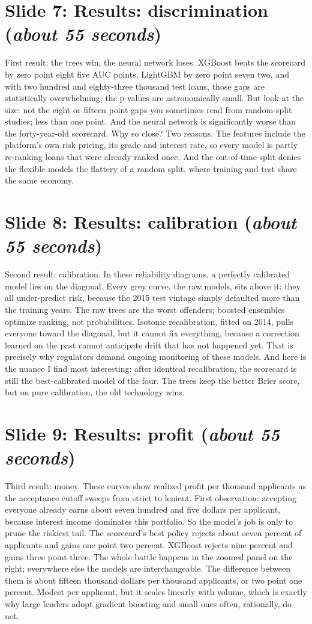 \documentclass[a4paper,11pt]{article}
\newcommand{\slideblock}[3]{%
  \section*{Slide #1: #2 \hfill \normalfont\small(\textit{#3})}}
\begin{document}
\slideblock{7}{Results: discrimination}{about 55 seconds}
First result: the trees win, the neural network loses. XGBoost beats the scorecard by zero point eight five AUC points, LightGBM by zero point seven two, and with two hundred and eighty-three thousand test loans, those gaps are statistically overwhelming; the p-values are astronomically small. But look at the size: not the eight or fifteen point gaps you sometimes read from random-split studies; less than one point. And the neural network is significantly worse than the forty-year-old scorecard. Why so close? Two reasons. The features include the platform's own risk pricing, its grade and interest rate, so every model is partly re-ranking loans that were already ranked once. And the out-of-time split denies the flexible models the flattery of a random split, where training and test share the same economy.

\slideblock{8}{Results: calibration}{about 55 seconds}
Second result: calibration. In these reliability diagrams, a perfectly calibrated model lies on the diagonal. Every grey curve, the raw models, sits above it: they all under-predict risk, because the 2015 test vintage simply defaulted more than the training years. The raw trees are the worst offenders; boosted ensembles optimize ranking, not probabilities. Isotonic recalibration, fitted on 2014, pulls everyone toward the diagonal, but it cannot fix everything, because a correction learned on the past cannot anticipate drift that has not happened yet. That is precisely why regulators demand ongoing monitoring of these models. And here is the nuance I find most interesting: after identical recalibration, the scorecard is still the best-calibrated model of the four. The trees keep the better Brier score, but on pure calibration, the old technology wins.

\slideblock{9}{Results: profit}{about 55 seconds}
Third result: money. These curves show realized profit per thousand applicants as the acceptance cutoff sweeps from strict to lenient. First observation: accepting everyone already earns about seven hundred and five dollars per applicant, because interest income dominates this portfolio. So the model's job is only to prune the riskiest tail. The scorecard's best policy rejects about seven percent of applicants and gains one point two percent. XGBoost rejects nine percent and gains three point three. The whole battle happens in the zoomed panel on the right; everywhere else the models are interchangeable. The difference between them is about fifteen thousand dollars per thousand applicants, or two point one percent. Modest per applicant, but it scales linearly with volume, which is exactly why large lenders adopt gradient boosting and small ones often, rationally, do not.
\end{document}
